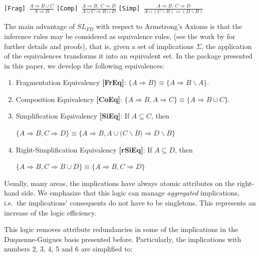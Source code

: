 \begin{center}
{\scriptsize \tt{[Frag]}}\ {\footnotesize $\displaystyle\frac{A\Rightarrow B\cup C}{A\Rightarrow B}$}
 \quad
{\scriptsize \tt{[Comp]}}\  {\footnotesize $\displaystyle\frac{A\Rightarrow B,\ C \Rightarrow D}{A\cup C \Rightarrow B\cup D}$ } \quad
{\scriptsize \tt{[Simp]}}\  {\footnotesize $\displaystyle\frac{A\Rightarrow B,\ C \Rightarrow D}{A\cup(C\smallsetminus B)\Rightarrow(D\smallsetminus B)}$}
\end{center}

The main advantage of \(SL_{FD}\) with respect to Armstrong's Axioms is
that the inference rules may be considered as equivalence rules, (see the work by
\citet{Mora2012} for further details and proofs), that is, given a set
of implications \(\Sigma\), the application of the equivalences
transforms it into an equivalent set. In the package presented in this
paper, we develop the following equivalences:

\begin{enumerate}
\item  Fragmentation Equivalency {\bf [FrEq]}:
$\{A\Rightarrow B\}\equiv\{A\Rightarrow B\smallsetminus A\}$.
\item  Composition Equivalency {\bf [CoEq]}:
$\{A\Rightarrow B, A\Rightarrow C\}\equiv\{A\Rightarrow B{\cup} C\}$.
\item Simplification Equivalency {\bf [SiEq]}:
If $A\subseteq C${,} then\\[2mm]
\centerline{$
\{A\Rightarrow B, C \Rightarrow D\}\equiv  \{A\Rightarrow B, { A\cup(}C\smallsetminus B)\Rightarrow D\smallsetminus B\}$}
\item {Right-Simplification Equivalency {\bf [rSiEq]}:
If $A\subseteq D$, then\\[2mm]
\centerline{$
 \{A\Rightarrow B, C\Rightarrow B\cup D\}\equiv \{A\Rightarrow B, C \Rightarrow D\}$}}
\end{enumerate}

Usually, many areas, the implications have always atomic attributes on
the right-hand side. We emphasize that this logic can manage
\emph{aggregated} implications, i.e.~the implications' consequents do
not have to be singletons. This represents an increase of the logic
efficiency.

This logic removes attribute redundancies in some of the implications in
the Duquenne-Guigues basis presented before. Particularly, the
implications with numbers 2, 3, 4, 5 and 6 are simplified to:
\begingroup\footnotesize


